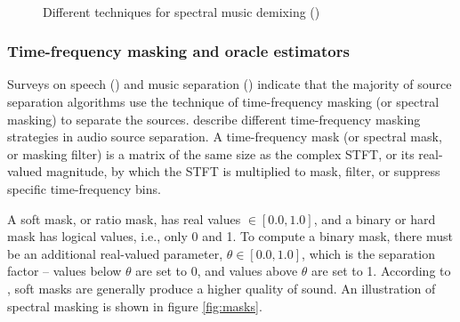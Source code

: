 \documentclass[report.tex]{subfiles}
\begin{document}
\begin{figure}[ht]
	\centering
	\\
	\caption{Different techniques for spectral music demixing (\cite{musicsepgood})}
	\label{fig:spectraldemix}
\end{figure}

\newpagefill

\subsubsection{Time-frequency masking and oracle estimators}
\label{sec:masksandoracles}

Surveys on speech (\cite{speechmask}) and music separation (\cite{musicmask}) indicate that the majority of source separation algorithms use the technique of time-frequency masking (or spectral masking) to separate the sources.  \textcite{masking} describe different time-frequency masking strategies in audio source separation. A time-frequency mask (or spectral mask, or masking filter) is a matrix of the same size as the complex STFT, or its real-valued magnitude, by which the STFT is multiplied to mask, filter, or suppress specific time-frequency bins.

A soft mask, or ratio mask, has real values $\in [0.0, 1.0]$, and a binary or hard mask has logical values, i.e., only 0 and 1. To compute a binary mask, there must be an additional real-valued parameter, $\theta \in [0.0, 1.0]$, which is the separation factor -- values below $\theta$ are set to 0, and values above $\theta$ are set to 1. According to \textcite{masking}, soft masks are generally produce a higher quality of sound. An illustration of spectral masking is shown in figure \ref{fig:masks}.
\end{document}
